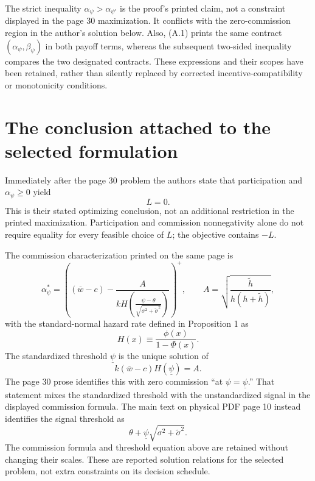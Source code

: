 \documentclass{article}
\begin{document}
The strict inequality \(\alpha_\psi>\alpha_{\psi'}\) is the proof's printed claim, not a constraint displayed in the page 30 maximization. It conflicts with the zero-commission region in the author's solution below. Also, (A.1) prints the same contract \((\alpha_\psi,\beta_\psi)\) in both payoff terms, whereas the subsequent two-sided inequality compares the two designated contracts. These expressions and their scopes have been retained, rather than silently replaced by corrected incentive-compatibility or monotonicity conditions.

\section*{The conclusion attached to the selected formulation}

Immediately after the page 30 problem the authors state that participation and \(\alpha_\psi\geq0\) yield
\[
L=0.
\]
This is their stated optimizing conclusion, not an additional restriction in the printed maximization. Participation and commission nonnegativity alone do not require equality for every feasible choice of \(L\); the objective contains \(-L\).

The commission characterization printed on the same page is
\[
\alpha_\psi^*
=\left(
(\overline w-c)
-\frac{A}{kH\left(\frac{\psi-\theta}{\sqrt{\sigma^2+\widetilde\sigma^2}}\right)}
\right)^+,
\qquad
A=\sqrt{\frac{\widetilde h}{h(h+\widetilde h)}},
\]
with the standard-normal hazard rate defined in Proposition 1 as
\[
H(x)\equiv\frac{\phi(x)}{1-\Phi(x)}.
\]
The standardized threshold \(\underline\psi\) is the unique solution of
\[
k(\overline w-c)H(\underline\psi)=A.
\]
The page 30 prose identifies this with zero commission ``at \(\psi=\underline\psi\).'' That statement mixes the standardized threshold with the unstandardized signal in the displayed commission formula. The main text on physical PDF page 10 instead identifies the signal threshold as
\[
\theta+\underline\psi\sqrt{\sigma^2+\widetilde\sigma^2}.
\]
The commission formula and threshold equation above are retained without changing their scales. These are reported solution relations for the selected problem, not extra constraints on its decision schedule.
\end{document}
